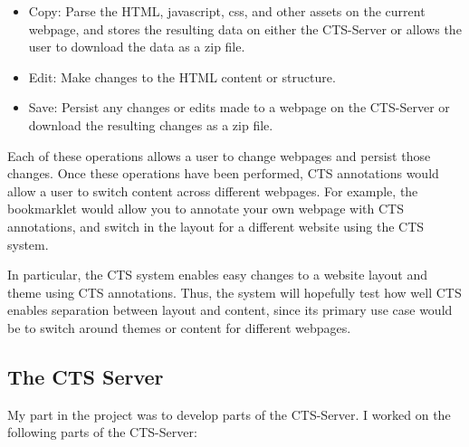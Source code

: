 \documentclass[12pt]{article}
\begin{document}
\begin{itemize}
  \item Copy: Parse the HTML, javascript, css, and other assets on the current webpage, and stores the resulting data on either the CTS-Server or allows the user to download the data as a zip file.
  \item Edit: Make changes to the HTML content or structure.
  \item Save: Persist any changes or edits made to a webpage on the CTS-Server or download the resulting changes as a zip file.
\end{itemize}

Each of these operations allows a user to change webpages and persist those changes. Once these operations have been performed, CTS annotations would allow a user to switch content across different webpages. For example, the bookmarklet would allow you to annotate your own webpage with CTS annotations, and switch in the layout for a different website using the CTS system.

In particular, the CTS system enables easy changes to a website layout and theme using CTS annotations. Thus, the system will hopefully test how well CTS enables separation between layout and content, since its primary use case would be to switch around themes or content for different webpages.

\subsection{The CTS Server}

My part in the project was to develop parts of the CTS-Server. I worked on the following parts of the CTS-Server:
\end{document}
